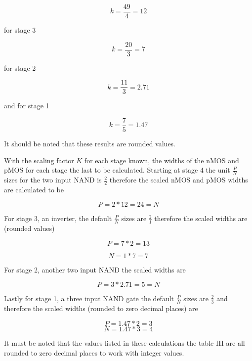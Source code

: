 \documentclass[conference]{IEEEtran}
\begin{document}
$$ k = \frac{49}{4} = 12 $$

for stage 3

$$ k = \frac{20}{3} = 7 $$

for stage 2

$$ k = \frac{11}{3} = 2.71$$

and for stage 1 

$$ k = \frac{7}{5} = 1.47$$

It should be noted that these results are rounded values.

With the scaling factor $K$ for each stage known, the widths of the nMOS and pMOS for each stage the last to be calculated. Starting at stage 4 the unit $\frac{P}{N}$ sizes for the two input NAND is $\frac{2}{2}$ therefore the scaled nMOS and pMOS widths are calculated to be 

$$ P = 2*12 = 24 = N$$

For stage 3, an inverter, the default $\frac{P}{N}$ sizes are $\frac{2}{1}$ therefore the scaled widths are (rounded values)

$$ P = 7*2 = 13 $$

$$ N = 1*7 = 7 $$

For stage 2, another two input NAND the scaled widths are 

$$ P = 3*2.71 = 5 = N$$

Lastly for stage 1, a three input NAND gate the default $\frac{P}{N}$ sizes are $\frac{2}{3}$ and therefore the scaled widths (rounded to zero decimal places) are

$$ P = 1.47*2 = 3 $$
$$ N = 1.47*3 = 4 $$

It must be noted that the values listed in these calculations the table III are all rounded to zero decimal places to work with integer values. 
\end{document}
